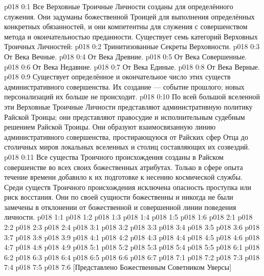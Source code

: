 \author{Божественный Советник}
\vs p018 0:1 Все Верховные Троичные Личности созданы для определённого служения. Они задуманы божественной Троицей для выполнения определённых конкретных обязанностей, и они компетентны для служения с совершенством метода и окончательностью преданности. Существует семь категорий Верховных Троичных Личностей:
\vs p018 0:2 Тринитизованные Секреты Верховности.
\vs p018 0:3 От Века Вечные.
\vs p018 0:4 От Века Древние.
\vs p018 0:5 От Века Совершенные.
\vs p018 0:6 От Века Недавние.
\vs p018 0:7 От Века Единые.
\vs p018 0:8 От Века Верные.
\vs p018 0:9 \pc Существует определённое и окончательное число этих существ административного совершенства. Их создание --- событие прошлого; новых персонализаций их больше не происходит.
\vs p018 0:10 По всей большой вселенной эти Верховные Троичные Личности представляют административную политику Райской Троицы; они представляют правосудие и  исполнительным судебным решением Райской Троицы. Они образуют взаимосвязанную линию административного совершенства, простирающуюся от Райских сфер Отца до столичных миров локальных вселенных и столиц составляющих их созвездий.
\vs p018 0:11 Все существа Троичного происхождения созданы в Райском совершенстве во всех своих божественных атрибутах. Только в сфере опыта течение времени добавило к их подготовке к несению космической службы. Среди существ Троичного происхождения исключена опасность проступка или риск восстания. Они по своей сущности божественны и никогда не были замечены в отклонении от божественной и совершенной линии поведения личности.
\vs p018 1:1 
\vs p018 1:2 
\vs p018 1:3 
\vs p018 1:4 \pc 
\vs p018 1:5 
\vs p018 1:6 
\vs p018 2:1 
\vs p018 2:2 
\vs p018 2:3 
\vs p018 2:4 
\vs p018 3:1 
\vs p018 3:2 
\vs p018 3:3 
\vs p018 3:4 \pc 
\vs p018 3:5 \pc 
\vs p018 3:6 
\vs p018 3:7 
\vs p018 3:8 \pc 
\vs p018 3:9 
\vs p018 4:1 
\vs p018 4:2 
\vs p018 4:3 \pc 
\vs p018 4:4 \pc 
\vs p018 4:5 
\vs p018 4:6 
\vs p018 4:7 \pc 
\vs p018 4:8 
\vs p018 4:9 
\vs p018 5:1 
\vs p018 5:2 
\vs p018 5:3 
\vs p018 5:4 
\vs p018 5:5 
\vs p018 6:1 
\vs p018 6:2 
\vs p018 6:3 
\vs p018 6:4 
\vs p018 6:5 \pc 
\vs p018 6:6 
\vs p018 6:7 
\vs p018 7:1 
\vs p018 7:2 
\vs p018 7:3 
\vs p018 7:4 
\vs p018 7:5 
\vsetoff
\vs p018 7:6 [Представлено Божественным Советником Уверсы]
\quizlink

